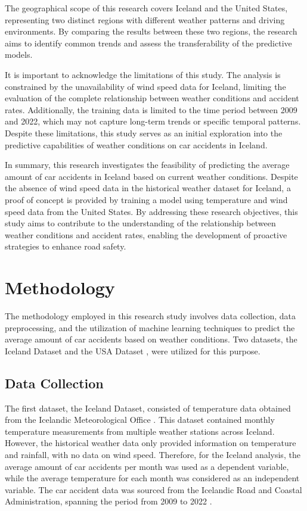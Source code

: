 \documentclass{article}
\begin{document}
The geographical scope of this research covers Iceland and the United States, representing two distinct regions with different weather patterns and driving environments. By comparing the results between these two regions, the research aims to identify common trends and assess the transferability of the predictive models.

It is important to acknowledge the limitations of this study. The analysis is constrained by the unavailability of wind speed data for Iceland, limiting the evaluation of the complete relationship between weather conditions and accident rates. Additionally, the training data is limited to the time period between 2009 and 2022, which may not capture long-term trends or specific temporal patterns. Despite these limitations, this study serves as an initial exploration into the predictive capabilities of weather conditions on car accidents in Iceland.

In summary, this research investigates the feasibility of predicting the average amount of car accidents in Iceland based on current weather conditions. Despite the absence of wind speed data in the historical weather dataset for Iceland, a proof of concept is provided by training a model using temperature and wind speed data from the United States. By addressing these research objectives, this study aims to contribute to the understanding of the relationship between weather conditions and accident rates, enabling the development of proactive strategies to enhance road safety.

\newpage
\section{Methodology}

The methodology employed in this research study involves data collection, data preprocessing, and the utilization of machine learning techniques to predict the average amount of car accidents based on weather conditions. Two datasets, the Iceland Dataset and the USA Dataset \cite{usa_data}, were utilized for this purpose.

\subsection{Data Collection}

The first dataset, the Iceland Dataset, consisted of temperature data obtained from the Icelandic Meteorological Office \cite{isl_weather_data}. This dataset contained monthly temperature measurements from multiple weather stations across Iceland. However, the historical weather data only provided information on temperature and rainfall, with no data on wind speed. Therefore, for the Iceland analysis, the average amount of car accidents per month was used as a dependent variable, while the average temperature for each month was considered as an independent variable. The car accident data was sourced from the Icelandic Road and Coastal Administration, spanning the period from 2009 to 2022 \cite{isl_accident_data}.
\end{document}
